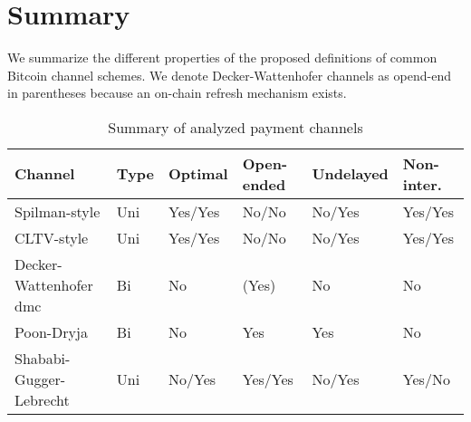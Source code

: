 \documentclass{llncs}
\begin{document}
\section{Summary}

We summarize the different properties of the proposed definitions of common Bitcoin channel schemes.
We denote Decker-Wattenhofer channels as opend-end in parentheses because an on-chain refresh mechanism exists.

\begin{table}[H]
  \begin{tabularx}{\textwidth}{ | X | l | l | l | l | l |}
  \hline
  Channel & Type & Optimal & Open-ended & Undelayed & Non-inter. \\
  \hline \hline
  Spilman-style & Uni & Yes/Yes & No/No & No/Yes & Yes/Yes \\ \hline
  CLTV-style & Uni & Yes/Yes & No/No & No/Yes & Yes/Yes \\ \hline
  Decker-Wattenhofer \gls{dmc} & Bi & No & (Yes) & No & No \\ \hline
  Poon-Dryja & Bi & No & Yes & Yes & No \\ \hline
  Shababi-Gugger-Lebrecht & Uni & No/Yes & Yes/Yes & No/Yes & Yes/No \\
  \hline
  \end{tabularx}
  \caption{Summary of analyzed payment channels}
  \label{fig:summaryPaymentChannel}
\end{table}




%
%

%
%
\printbibliography
\end{document}
